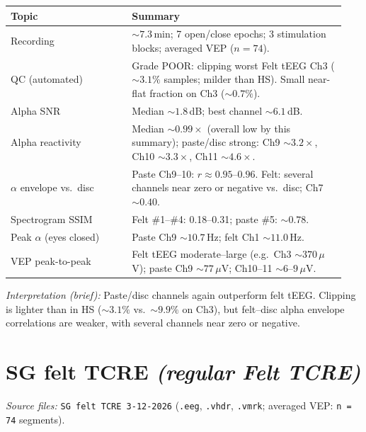 \documentclass[11pt]{article}
\begin{document}
\begin{table}[h]
  \centering
  \small
  \begin{tabular}{@{}p{0.34\linewidth}p{0.60\linewidth}@{}}
    \toprule
    \textbf{Topic} & \textbf{Summary} \\
    \midrule
    Recording & ${\sim}7.3$\,min; 7 open/close epochs; 3 stimulation blocks; averaged VEP ($n=74$). \\
    QC (automated) & Grade POOR: clipping worst Felt tEEG Ch3 (${\sim}3.1\%$ samples; milder than HS). Small near-flat fraction on Ch3 (${\sim}0.7\%$). \\
    Alpha SNR & Median ${\sim}1.8$\,dB; best channel ${\sim}6.1$\,dB. \\
    Alpha reactivity & Median ${\sim}0.99\times$ (overall low by this summary); paste/disc strong: Ch9 ${\sim}3.2\times$, Ch10 ${\sim}3.3\times$, Ch11 ${\sim}4.6\times$. \\
    $\alpha$ envelope vs.\ disc & Paste Ch9--10: $r \approx 0.95$--$0.96$. Felt: several channels near zero or negative vs.\ disc; Ch7 ${\sim}0.40$. \\
    Spectrogram SSIM & Felt \#1--\#4: 0.18--0.31; paste \#5: ${\sim}0.78$. \\
    Peak $\alpha$ (eyes closed) & Paste Ch9 ${\sim}10.7$\,Hz; felt Ch1 ${\sim}11.0$\,Hz. \\
    VEP peak-to-peak & Felt tEEG moderate--large (e.g.\ Ch3 ${\sim}370$\,$\mu$V); paste Ch9 ${\sim}77$\,$\mu$V; Ch10--11 ${\sim}6$--$9$\,$\mu$V. \\
    \bottomrule
  \end{tabular}
\end{table}

\noindent\textit{Interpretation (brief):} Paste/disc channels again outperform felt tEEG. Clipping is lighter than in HS (${\sim}3.1\%$ vs.\ ${\sim}9.9\%$ on Ch3), but felt--disc alpha envelope correlations are weaker, with several channels near zero or negative.

\section*{SG felt TCRE \textnormal{\textit{(regular Felt TCRE)}}}
\textit{Source files:} \texttt{SG felt TCRE 3-12-2026} (\texttt{.eeg}, \texttt{.vhdr}, \texttt{.vmrk}; averaged VEP: \texttt{n\,=\,74} segments).
\end{document}
